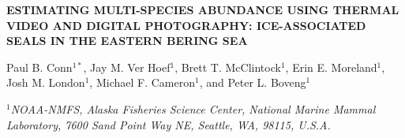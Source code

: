 \documentclass[12pt,fleqn]{article}
\begin{document}
\begin{center} \bf {\large ESTIMATING MULTI-SPECIES ABUNDANCE USING THERMAL VIDEO AND DIGITAL PHOTOGRAPHY: ICE-ASSOCIATED SEALS IN THE EASTERN BERING SEA}

\vspace{0.7cm}
Paul B. Conn$^{1*}$, Jay M. Ver Hoef$^1$, Brett T. McClintock$^1$, Erin E. Moreland$^1$, Josh M. London$^1$, Michael F. Cameron$^1$, and Peter L. Boveng$^1$
\end{center}
\vspace{0.5cm}

\rm
\small

\it $^1$NOAA-NMFS, Alaska Fisheries Science Center, National Marine Mammal Laboratory, 7600 Sand Point Way NE, Seattle, WA, 98115, U.S.A.\\
\end{document}
